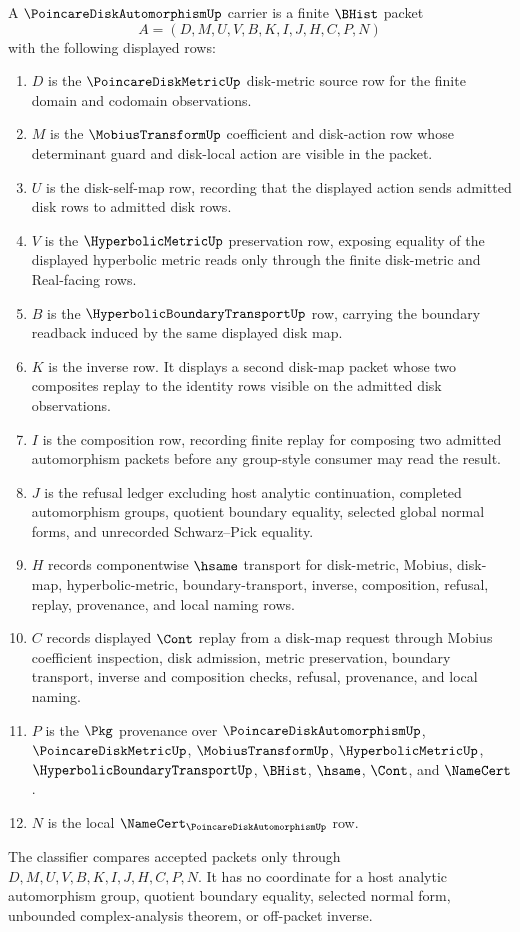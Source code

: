 \begin{definition}
\label{def:poincare-disk-automorphism-carrier}
A $\PoincareDiskAutomorphismUp$ carrier is a finite $\BHist$ packet
$$
A=(D,M,U,V,B,K,I,J,H,C,P,N)
$$
with the following displayed rows:
\begin{enumerate}
\item $D$ is the $\PoincareDiskMetricUp$ disk-metric source row for the finite domain and codomain observations.
\item $M$ is the $\MobiusTransformUp$ coefficient and disk-action row whose determinant guard and disk-local action are visible in the packet.
\item $U$ is the disk-self-map row, recording that the displayed action sends admitted disk rows to admitted disk rows.
\item $V$ is the $\HyperbolicMetricUp$ preservation row, exposing equality of the displayed hyperbolic metric reads only through the finite disk-metric and Real-facing rows.
\item $B$ is the $\HyperbolicBoundaryTransportUp$ row, carrying the boundary readback induced by the same displayed disk map.
\item $K$ is the inverse row. It displays a second disk-map packet whose two composites replay to the identity rows visible on the admitted disk observations.
\item $I$ is the composition row, recording finite replay for composing two admitted automorphism packets before any group-style consumer may read the result.
\item $J$ is the refusal ledger excluding host analytic continuation, completed automorphism groups, quotient boundary equality, selected global normal forms, and unrecorded Schwarz--Pick equality.
\item $H$ records componentwise $\hsame$ transport for disk-metric, Mobius, disk-map, hyperbolic-metric, boundary-transport, inverse, composition, refusal, replay, provenance, and local naming rows.
\item $C$ records displayed $\Cont$ replay from a disk-map request through Mobius coefficient inspection, disk admission, metric preservation, boundary transport, inverse and composition checks, refusal, provenance, and local naming.
\item $P$ is the $\Pkg$ provenance over $\PoincareDiskAutomorphismUp$, $\PoincareDiskMetricUp$, $\MobiusTransformUp$, $\HyperbolicMetricUp$, $\HyperbolicBoundaryTransportUp$, $\BHist$, $\hsame$, $\Cont$, and $\NameCert$.
\item $N$ is the local $\NameCert_{\PoincareDiskAutomorphismUp}$ row.
\end{enumerate}
The classifier compares accepted packets only through
$D,M,U,V,B,K,I,J,H,C,P,N$. It has no coordinate for a host analytic
automorphism group, quotient boundary equality, selected normal form,
unbounded complex-analysis theorem, or off-packet inverse.
\end{definition}

